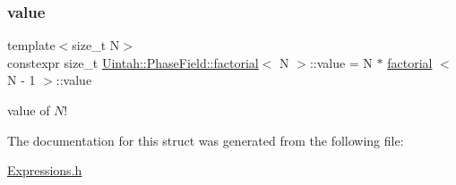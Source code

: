\subsubsection{\texorpdfstring{value}{value}}
{\footnotesize\ttfamily template$<$size\+\_\+t N$>$ \\
constexpr size\+\_\+t \hyperlink{structUintah_1_1PhaseField_1_1factorial}{Uintah\+::\+Phase\+Field\+::factorial}$<$ N $>$\+::value = N $\ast$ \hyperlink{structUintah_1_1PhaseField_1_1factorial}{factorial} $<$ N -\/ 1 $>$\+::value\hspace{0.3cm}{\ttfamily [static]}}



value of $ N! $ 



The documentation for this struct was generated from the following file\+:\begin{DoxyCompactItemize}
\item 
\hyperlink{Expressions_8h}{Expressions.\+h}\end{DoxyCompactItemize}
